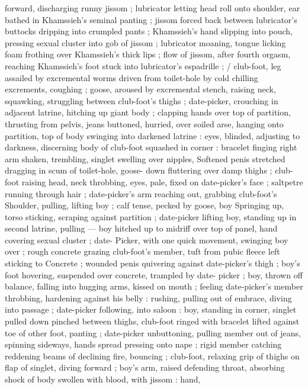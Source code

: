 forward, discharging runny jissom ; lubricator letting head roll onto
shoulder, ear bathed in Khamssieh’s seminal panting ; jissom forced
back between lubricator’s buttocks dripping into crumpled pants ;
Khamssieh's hand slipping into pouch, pressing sexual cluster into
gob of jissom ; lubricator moaning, tongue licking foam frothing over
Khamssieh’s thick lips ; flow of jissom, after fourth orgasm, reaching
Khamssieh's foot stuck into lubricator's espadrille ; / club-foot, leg
assailed by excremental worms driven from toilet-hole by cold
chilling excrements, coughing ; goose, aroused by excremental
stench, raising neck, squawking, struggling between club-foot’s
thighs ; date-picker, crouching in adjacent latrine, hitching up giant
body ; clapping hands over top of partition, thrusting from pelvis,
jeans buttoned, hurried, over soiled arse, hanging onto partition, top
of body swinging into darkened latrine : eyes, blinded, adjusting to
darkness, discerning body of club-foot squashed in corner : bracelet
finging right arm shaken, trembling, singlet swelling over nipples,
Softened penis stretched dragging in scum of toilet-hole, goose-
down fluttering over damp thighs ; club-foot raising head, neck
throbbing, eyes, pale, fixed on date-picker's face ; saltpetre running
through hair ; date-picker's arm reaching out, grabbing club-foot’s
Shoulder, pulling, lifting boy ; calf tense, pecked by goose, boy
Springing up, torso sticking, scraping against partition ; date-picker
lifting boy, standing up in second latrine, pulling --- boy hitched up
to midriff over top of panel, hand covering sexual cluster ; date-
Picker, with one quick movement, swinging boy over ; rough concrete
grazing club-foot's member, tuft from pubic fleece left sticking to
Concrete ; wounded penis quivering against date-picker's thigh ;
boy's foot hovering, suspended over concrete, trampled by date-
picker ; boy, thrown off balance, falling into hugging arms, kissed on
mouth ; feeling date-picker's member throbbing, hardening against
his belly : rushing, pulling out of embrace, diving into passage ;
date-picker following, into saloon : boy, standing in corner, singlet
pulled down pinched between thighs, club-foot ringed with bracelet
lifted against toe of other foot, panting ; date-picker unbuttoning,
pulling member out of jeans, spinning sideways, hands spread
pressing onto nape ; rigid member catching reddening beams of
declining fire, bouncing ; club-foot, relaxing grip of thighs on flap of
singlet, diving forward ; boy's arm, raised defending throat,
absorbing shock of body swollen with blood, with jissom : hand,
